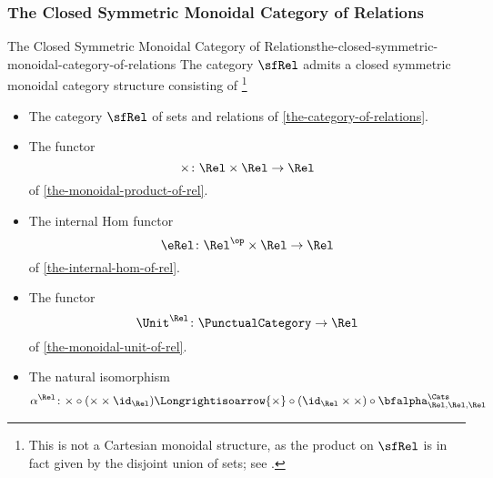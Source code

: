 \subsubsection{The Closed Symmetric Monoidal Category of Relations}\label{subsubsection-the-closed-symmetric-monoidal-category-of-relations}
\begin{proposition}{The Closed Symmetric Monoidal Category of Relations}{the-closed-symmetric-monoidal-category-of-relations}%
    The category $\sfRel$ admits a closed symmetric monoidal category structure consisting of%
    \footnote{%
        \textdbend{}This is not a Cartesian monoidal structure, as the product on $\sfRel$ is in fact given by the disjoint union of sets; see .
        \par\vspace*{\TCBBoxCorrection}
    }%
    \begin{itemize}
        \item{}The category $\sfRel$ of sets and relations of \cref{the-category-of-relations}.
        \item{}The functor
            \[
                \times%
                \colon%
                \Rel\times\Rel%
                \to%
                \Rel
            \]%
            of \cref{the-monoidal-product-of-rel}.
        \item{}The internal Hom functor
            \[
                \eRel%
                \colon%
                \Rel^{\op}\times\Rel%
                \to%
                \Rel%
            \]%
            of \cref{the-internal-hom-of-rel}.
        \item{}The functor
            \[
                \Unit^{\Rel}
                \colon
                \PunctualCategory
                \to
                \Rel
            \]
            of \cref{the-monoidal-unit-of-rel}.
        \item{}The natural isomorphism
            \[
                \alpha^{\Rel}
                \colon
                {\times}\circ{({\times}\times\id_{\Rel})}
                \Longrightisoarrow
                {\times}\circ{(\id_{\Rel}\times{\times})}\circ{\bfalpha^{\Cats}_{\Rel,\Rel,\Rel}}
            \]

\end{itemize}
\end{proposition}
